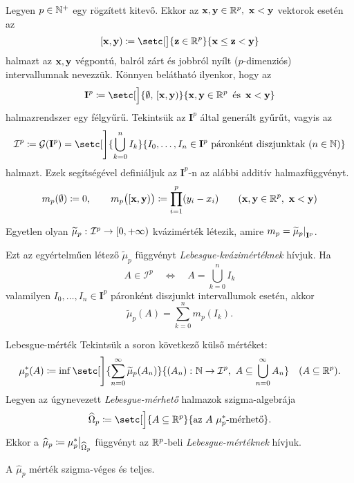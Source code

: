 \documentclass[
]{elteikthesis}[2024/04/26]
\begin{document}
	Legyen \( p \in \mathbb{N}^+ \) egy rögzített kitevő. 
	Ekkor az \( \vb{x}, \vb{y} \in \mathbb{R}^p, \ \vb{x} < \vb{y} \) vektorok esetén az
	\[
	[\x, \y) \coloneq 
	\setc[\big]{ \vb{z} \in \R^p }{ \x \leq \vb{z} < \y }
	\]
	halmazt az \( \vb{x}, \vb{y} \) végpontú, balról zárt és jobbról nyílt (\( p \)-dimenziós) intervallumnak nevezzük. Könnyen belátható ilyenkor, hogy az
	\[
	\mathbf{I}^p \coloneq 
	\setc[\Big]{ \emptyset,\, [\x, \y) }{ \x, \y \in \R^p \,\text{ és }\, \x < \y }
	\]
	halmazrendszer egy félgyűrű. Tekintsük az \( \mathbf{I}^p \) által generált gyűrűt, vagyis az
	\[
	\mathcal{I}^p \coloneq 
	\mathcal{G}( \mathbf{I}^p ) =
	\setc[\Bigg]{ \bigcup_{k=0}^n I_k }
	{ I_0, \dots, I_n \in \mathbf{I}^p \text{ páronként diszjunktak } (n \in \N) }
	\]
	halmazt.
	Ezek segítségével definiáljuk az \( \mathbf{I}^p \)-n az alábbi additív halmazfüggvényt.
	\[
		m_p( \emptyset ) \coloneq 0, \qquad
		m_p \bigl( [\vb{x}, \vb{y}) \bigr) \coloneq \prod_{i=1}^{p} (y_i - x_i) \qquad
		( \vb{x}, \vb{y} \in \mathbb{R}^p, \ \vb{x} < \vb{y})
	\]
	
	\begin{theorem}{}{}
		Egyetlen olyan
		\( \widetilde{\mu}_p  \,\colon \mathcal{I}^p \to [0, +\infty) \) kvázimérték létezik, amire
		\( m_p = \restr{ \widetilde{\mu}_p }{ \mathbf{I}^p } \).
	\end{theorem}
	
	
	\vspace{3pt}
	\noindent
	Ezt az egyértelműen létező \( \widetilde{\mu}_p \) függvényt 
	\emph{Lebesgue-kvázimértéknek} hívjuk. 
	Ha
	\[
		A \in \mathcal{I}^p
		\quad \iff \quad
		A = \bigcup_{k=0}^{n} I_k
	\]
	valamilyen \( I_0, \dots, I_n \in \mathbf{I}^p \) páronként diszjunkt intervallumok esetén, akkor
	\[
		\widetilde{\mu}_p(A) = \sum_{k=0}^{n} m_p(I_k).
	\]
	
	\begin{definition}{Lebesgue-mérték}{}
		Tekintsük a soron következő külső mértéket:
		\[
			\mu_p^*( A ) \coloneq
			\inf \setc[\Bigg]{ \sum_{n=0}^{\infty} \widetilde{\mu}_p(A_n) }
			                 { \func{(A_n)}{\N}{\mathcal{I}^p}, \ A \subseteq \bigcup_{n=0}^{\infty} A_n }
			\quad (A \subseteq \R^p).
		\]
		Legyen az úgynevezett \emph{Lebesgue-mérhető} halmazok szigma-algebrája
		\[
			\widehat{\Omega}_p \coloneq
			\setc[\Big]{ A \subseteq \R^p }{ \text{az } A \ \mu_p^* \text{-mérhető} }.
		\]
		Ekkor a \( \widehat{ \mu }_p \coloneq \restr{ \mu_p^* }{ \widehat{\Omega}_p } \) 
		függvényt az \( \mathbb{R}^p \)-beli \emph{Lebesgue-mértéknek} hívjuk.
	\end{definition}
	
	\begin{note}
		A \( \widehat{ \mu }_p \) mérték szigma-véges és teljes.
	\end{note}
	
\end{document}
